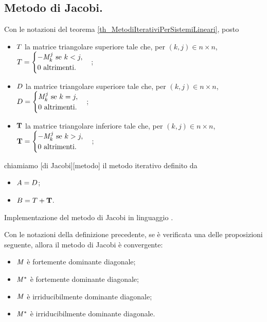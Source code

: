 \subsection{Metodo di Jacobi.}
\label{MetodiNumericiPerSistemiLineari_MetodoDiJacobi}
\begin{Definition}
  Con le notazioni del teorema \ref{th_MetodiIterativiPerSistemiLineari},
  posto
  \begin{itemize}
    \item $T$ la matrice triangolare superiore tale che,
      per $(k,j) \in n \times n$,
      $T =
        \begin{cases}
          - \mathit{M}_k^j\text{ se }k < j,\\
          0\text{ altrimenti}.
        \end{cases}$;
    \item $D$ la matrice triangolare superiore tale che,
      per $(k,j) \in n \times n$,
      $D =
        \begin{cases}
          \mathit{M}_k^j\text{ se }k = j,\\
          0\text{ altrimenti}.
        \end{cases}$;
    \item $\mathbf{T}$ la matrice triangolare inferiore tale che,
      per $(k,j) \in n \times n$,
      $\mathbf{T} =
        \begin{cases}
          - \mathit{M}_k^j\text{ se }k > j,\\
          0\text{ altrimenti}.
        \end{cases}$;
  \end{itemize}
  chiamiamo
  [di Jacobi][metodo]
  il metodo iterativo definito da
  \begin{itemize}
    \item $A = D$;
    \item $B = T + \mathbf{T}$.
  \end{itemize}
\end{Definition}
\begin{listing}
	\caption{Implementazione del metodo di Jacobi in linguaggio .}
\end{listing}
\begin{Theorem}
  Con le notazioni della definizione precedente,
  se \`e verificata una delle proposizioni seguente, allora
  il metodo di Jacobi \`e convergente:
  \begin{itemize}
    \item $\mathit{M}$ \`e fortemente dominante diagonale;
    \item ${\mathit{M}}^*$ \`e fortemente dominante diagonale;
    \item $\mathit{M}$ \`e irriducibilmente dominante diagonale;
    \item ${\mathit{M}}^*$ \`e irriducibilmente dominante diagonale.
  \end{itemize}
\end{Theorem}
